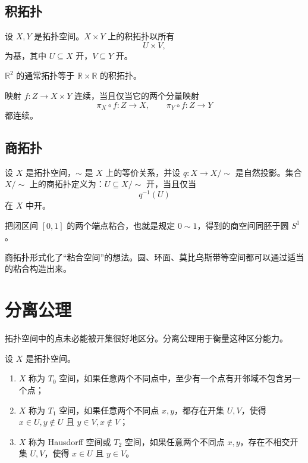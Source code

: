\subsection{积拓扑}

\begin{definition}[积拓扑]
设 $X,Y$ 是拓扑空间。$X\times Y$ 上的积拓扑以所有
\[
    U\times V,
\]
为基，其中 $U\subseteq X$ 开，$V\subseteq Y$ 开。
\end{definition}

\begin{example}
$\mathbb{R}^2$ 的通常拓扑等于 $\mathbb{R}\times\mathbb{R}$ 的积拓扑。
\end{example}

\begin{proposition}[映入积空间的连续性]
映射 $f:Z\to X\times Y$ 连续，当且仅当它的两个分量映射
\[
    \pi_X\circ f:Z\to X,
    \qquad
    \pi_Y\circ f:Z\to Y
\]
都连续。
\end{proposition}

\subsection{商拓扑}

\begin{definition}[商拓扑]
设 $X$ 是拓扑空间，$\sim$ 是 $X$ 上的等价关系，并设 $q:X\to X/\sim$ 是自然投影。集合 $X/\sim$ 上的商拓扑定义为：$U\subseteq X/\sim$ 开，当且仅当
\[
    q^{-1}(U)
\]
在 $X$ 中开。
\end{definition}

\begin{example}[圆作为商空间]
把闭区间 $[0,1]$ 的两个端点粘合，也就是规定 $0\sim1$，得到的商空间同胚于圆 $S^1$。
\end{example}

\begin{remark}
商拓扑形式化了“粘合空间”的想法。圆、环面、莫比乌斯带等空间都可以通过适当的粘合构造出来。
\end{remark}

\section{分离公理}

拓扑空间中的点未必能被开集很好地区分。分离公理用于衡量这种区分能力。

\begin{definition}[$T_0$、$T_1$ 与 Hausdorff 空间]
设 $X$ 是拓扑空间。
\begin{enumerate}
    \item $X$ 称为 $T_0$ 空间，如果任意两个不同点中，至少有一个点有开邻域不包含另一个点；
    \item $X$ 称为 $T_1$ 空间，如果任意两个不同点 $x,y$，都存在开集 $U,V$，使得 $x\in U,y\notin U$ 且 $y\in V,x\notin V$；
    \item $X$ 称为 Hausdorff 空间或 $T_2$ 空间，如果任意两个不同点 $x,y$，存在不相交开集 $U,V$，使得 $x\in U$ 且 $y\in V$。
\end{enumerate}
\end{definition}

